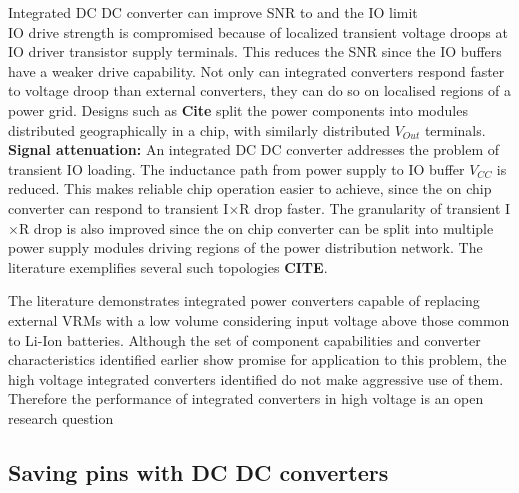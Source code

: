 \documentclass[letterpaper,twocolumn,10pt]{article}
\begin{document}
Integrated DC DC converter can improve SNR to and the IO limit\\
\indent IO drive strength is compromised because of localized transient voltage droops at IO driver transistor supply terminals. This reduces the SNR since the IO buffers have a weaker drive capability. Not only can integrated converters respond faster to voltage droop than external converters, they can do so on localised regions of a power grid. Designs such as \textbf{Cite} split the power components into modules distributed geographically in a chip, with similarly distributed $V_{Out}$ terminals.\\ 
\indent \textbf{Signal attenuation: }
An integrated DC DC converter addresses the problem of transient IO loading. The inductance path from power supply to IO buffer $V_{CC}$ is reduced. This makes reliable chip operation easier to achieve, since the on chip converter can respond to transient I$\times$R drop faster. The granularity of transient I$\times$R drop is also improved since the on chip converter can be split into multiple power supply modules driving regions of the power distribution network. The literature exemplifies several such topologies \textbf{CITE}. 


 
The literature demonstrates integrated power converters capable of replacing external VRMs with a low volume considering input voltage above those common to Li-Ion batteries. 
\indent Although the set of component capabilities and converter characteristics identified earlier show promise for application to this problem, the high voltage integrated converters identified do not make aggressive use of them. Therefore the performance of integrated converters in high voltage is an open research question  

\subsection{Saving pins with DC DC converters}
\end{document}
